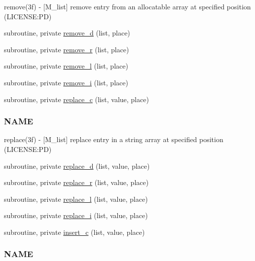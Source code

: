 \begin{DoxyCompactItemize}
\begin{DoxyCompactList}
remove(3f) -\/ \mbox{[}M\+\_\+list\mbox{]} remove entry from an allocatable array at specified position (L\+I\+C\+E\+N\+SE\+:PD) \end{DoxyCompactList}\item 
subroutine, private \mbox{\hyperlink{namespacem__list_a6c5f971866302b40b5952ad919203461}{remove\+\_\+d}} (list, place)
\item 
subroutine, private \mbox{\hyperlink{namespacem__list_af5940ed6b39d9e3429e2784767db9e56}{remove\+\_\+r}} (list, place)
\item 
subroutine, private \mbox{\hyperlink{namespacem__list_a138b6450613db943177df6258f58e89b}{remove\+\_\+l}} (list, place)
\item 
subroutine, private \mbox{\hyperlink{namespacem__list_acdc3299515ed0402f4213d76d3e4d4cf}{remove\+\_\+i}} (list, place)
\item 
subroutine, private \mbox{\hyperlink{namespacem__list_adddd2b7443557b3727320c314170e001}{replace\+\_\+c}} (list, value, place)
\begin{DoxyCompactList}\small\item\em \subsubsection*{N\+A\+ME}

replace(3f) -\/ \mbox{[}M\+\_\+list\mbox{]} replace entry in a string array at specified position (L\+I\+C\+E\+N\+SE\+:PD) \end{DoxyCompactList}\item 
subroutine, private \mbox{\hyperlink{namespacem__list_a9cac0a0b0d325d26267d37648f8eada6}{replace\+\_\+d}} (list, value, place)
\item 
subroutine, private \mbox{\hyperlink{namespacem__list_ac2ef50718d66bfe2fc102a3d48a28cb2}{replace\+\_\+r}} (list, value, place)
\item 
subroutine, private \mbox{\hyperlink{namespacem__list_a0de977b7f38554ccd2e8b6e668f11648}{replace\+\_\+l}} (list, value, place)
\item 
subroutine, private \mbox{\hyperlink{namespacem__list_a8c67651ca2c2c90d921f23146577491b}{replace\+\_\+i}} (list, value, place)
\item 
subroutine, private \mbox{\hyperlink{namespacem__list_ac9b841bea6c2cfed1608b2809aaf07b4}{insert\+\_\+c}} (list, value, place)
\begin{DoxyCompactList}\small\item\em \subsubsection*{N\+A\+ME}


\end{DoxyCompactList}
\end{DoxyCompactItemize}
